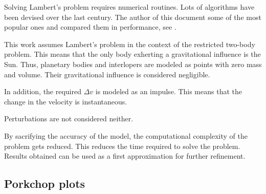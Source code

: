 Solving Lambert's problem requires numerical routines. Lots of algorithms have
been devised over the last century. The author of this document some of the most
popular ones and compared them in performance, see \cite{martinez2021}.

This work assumes Lambert's problem in the context of the restricted two-body
problem. This means that the only body exherting a gravitational influence is
the Sun. Thus, planetary bodies and interlopers are modeled as points with zero
mass and volume. Their gravitational influence is considered negligible.

In addition, the required $\Delta v$ is modeled as an impulse. This means that
the change in the velocity is instantaneous.

Perturbations are not considered neither.

By sacrifying the accuracy of the model, the computational complexity of the
problem gets reduced. This reduces the time required to solve the problem.
Results obtained can be used as a first approximation for further refinement.

\subsection{Porkchop plots}



